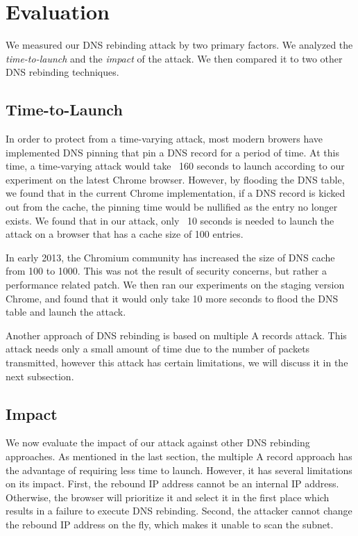 \section{Evaluation}
\label{sec:eval}
We measured our DNS rebinding attack by two primary factors. We analyzed the \emph{time-to-launch} and the \emph{impact} of the attack. We then compared it to two other DNS rebinding techniques. 

\subsection{Time-to-Launch}
In order to protect from a time-varying attack, most modern browers have implemented DNS pinning that pin a DNS record for a period of time. At this time, a time-varying attack would take ~160 seconds to launch according to our experiment on the latest Chrome browser. However, by flooding the DNS table, we found that in the current Chrome implementation, if a DNS record is kicked out from the cache, the pinning time would be nullified as the entry no longer exists. We found that in our attack, only ~10 seconds is needed to launch the attack on a browser that has a cache size of 100 entries. 

In early 2013, the Chromium community has increased the size of DNS cache from 100 to 1000. This was not the result of security concerns, but rather a performance related patch. We then ran our experiments on the staging version Chrome, and found that it would only take 10 more seconds to flood the DNS table and launch the attack. 

Another approach of DNS rebinding is based on multiple A records attack. This attack needs only a small amount of time due to the number of packets transmitted, however this attack has certain limitations, we will discuss it in the next subsection.

\subsection{Impact}
We now evaluate the impact of our attack against other DNS rebinding approaches. As mentioned in the last section, the multiple A record approach has the advantage of requiring less time to launch. However, it has several limitations on its impact. First, the rebound IP address cannot be an internal IP address. Otherwise, the browser will prioritize it and select it in the first place which results in a failure to execute DNS rebinding. Second, the attacker cannot change the rebound IP address on the fly, which makes it unable to scan the subnet. 

